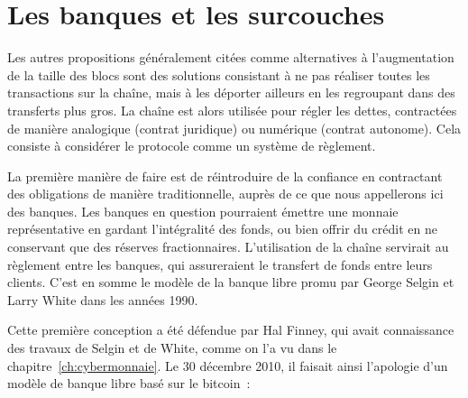 
\section*{Les banques et les surcouches}

Les autres propositions généralement citées comme alternatives à l'augmentation de la taille des blocs sont des solutions consistant à ne pas réaliser toutes les transactions sur la chaîne, mais à les déporter ailleurs en les regroupant dans des transferts plus gros. La chaîne est alors utilisée pour régler les dettes, contractées de manière analogique (contrat juridique) ou numérique (contrat autonome). Cela consiste à considérer le protocole comme un système de règlement.


La première manière de faire est de réintroduire de la confiance en contractant des obligations de manière traditionnelle, auprès de ce que nous appellerons ici des banques. Les banques en question pourraient émettre une monnaie représentative en gardant l'intégralité des fonds, ou bien offrir du crédit en ne conservant que des réserves fractionnaires. L'utilisation de la chaîne servirait au règlement entre les banques, qui assureraient le transfert de fonds entre leurs clients. C'est en somme le modèle de la banque libre promu par George Selgin et Larry White dans les années 1990.

Cette première conception a été défendue par Hal Finney, qui avait connaissance des travaux de Selgin et de White, comme on l'a vu dans le chapitre~\ref{ch:cybermonnaie}. Le 30 décembre 2010, il faisait ainsi l'apologie d'un modèle de banque libre basé sur le bitcoin~:

